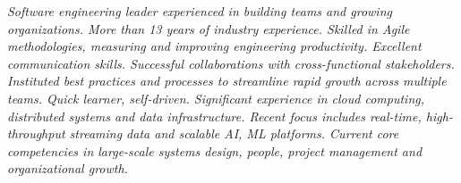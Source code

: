 {\selectfont
	\begin{small}
		\begin{justify}\textit{Software engineering leader experienced in building teams and growing organizations. More than 13 years of industry experience. Skilled in Agile methodologies, measuring and improving engineering productivity. Excellent communication skills. Successful collaborations with cross-functional stakeholders. Instituted best practices and processes to streamline rapid growth across multiple teams. Quick learner, self-driven. Significant experience in cloud computing, distributed systems and data infrastructure. Recent focus includes real-time, high-throughput streaming data and scalable AI, ML platforms. Current core competencies in large-scale systems design, people, project management and organizational growth.}\end{justify}
	\end{small}
}
\vspace{-12pt}